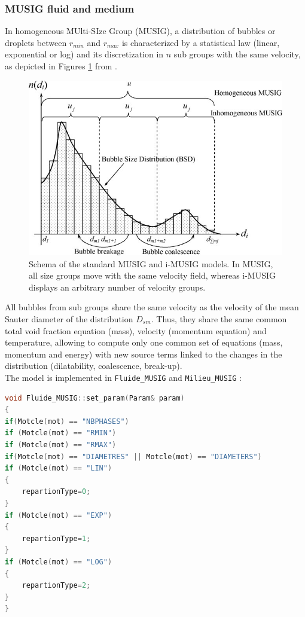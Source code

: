 \subsubsection{MUSIG fluid and medium}
In homogeneous MUlti-SIze Group (MUSIG), a distribution of bubbles or droplets between $r_{min}$ and $r_{max}$ is characterized by a statistical law (linear, exponential or log) and its discretization in $n$ sub groups with the same velocity, as depicted in Figures \ref{msgdis} from \cite{cheung}.
\begin{figure}[!ht]
    \centering
    \includegraphics[scale =0.8]{Figure/musigdistri.jpg}
    \caption{Schema of the standard MUSIG and i-MUSIG models. In MUSIG, all size groups move with the same velocity field, whereas i-MUSIG displays an arbitrary number of velocity groups.}
    \label{msgdis}
\end{figure}
All bubbles from sub groups share the same velocity as the velocity of the mean Sauter diameter of the distribution $D_{sm}$. Thus, they share the same common total void fraction equation (mass), velocity (momentum equation) and temperature, allowing to compute only one common set of equations (mass, momentum and energy) with new source terms linked to the changes in the distribution (dilatability, coalescence, break-up).\\
The model is implemented in \texttt{Fluide\_MUSIG} and \texttt{Milieu\_MUSIG} :
\begin{lstlisting}[language=c++]
void Fluide_MUSIG::set_param(Param& param)
{
if(Motcle(mot) == "NBPHASES")
if (Motcle(mot) == "RMIN")
if (Motcle(mot) == "RMAX")
if(Motcle(mot) == "DIAMETRES" || Motcle(mot) == "DIAMETERS")
if (Motcle(mot) == "LIN")
{
    repartionType=0;
}
if (Motcle(mot) == "EXP")
{
    repartionType=1;
}
if (Motcle(mot) == "LOG")
{
    repartionType=2;
}
}
\end{lstlisting}
